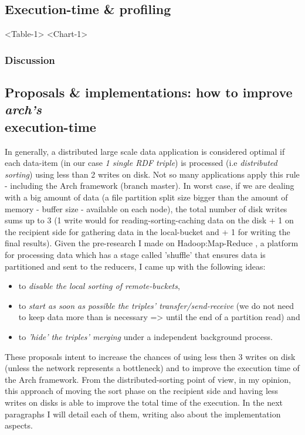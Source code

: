 \pagebreak

% 
\subsection{Execution-time \& profiling}

<Table-1>
<Chart-1>

% 
\subsubsection*{Discussion}

% 
\subsection{Proposals \& implementations: how to improve \textit{arch's} \\ execution-time}

In generally, a distributed large scale data application is considered optimal if each data-item (in our case \textit{1 single RDF triple}) is processed (i.e \textit{distributed sorting}) using less than 2 writes on disk. Not so many applications apply this rule - including the Arch framework (branch master). In worst case, if we are dealing with a big amount of data (a file partition split size bigger than the amount of memory - buffer size - available on each node), the total number of disk writes sums up to 3 (1 write would for reading-sorting-caching data on the disk + 1 on the recipient side for gathering data in the local-bucket and + 1 for writing the final results). Given the pre-research I made on Hadoop:Map-Reduce \cite{hadoop}, a platform for processing data which has a stage called 'shuffle' \cite{shuffling} that ensures data is partitioned and sent to the reducers, I came up with the following ideas: 
\begin{itemize}
\item to \textit{disable the local sorting of remote-buckets},
\item to \textit{start as soon as possible the triples' transfer/send-receive} (we do not need to keep data more than is necessary => until the end of a partition read) and
\item to \textit{'hide' the triples' merging} under a independent background process. 
\end{itemize}
  
These proposals intent to increase the chances of using less then 3 writes on disk (unless the network represents a bottleneck) and to improve the execution time of the Arch framework. From the distributed-sorting point of view, in my opinion, this approach of moving the sort phase on the recipient side and having less writes on disks is able to improve the total time of the execution. In the next paragraphs I will detail each of them, writing also about the implementation aspects.

